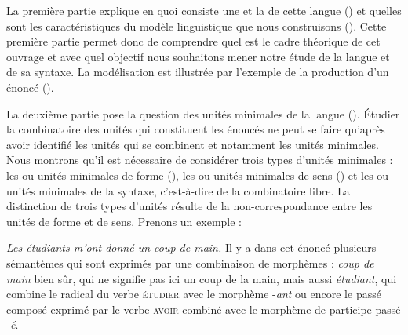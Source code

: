 La première partie explique en quoi consiste une  et la  de cette langue () et quelles sont les caractéristiques du modèle linguistique que nous construisons (). Cette première partie permet donc de comprendre quel est le cadre théorique de cet ouvrage et avec quel objectif nous souhaitons mener notre étude de la langue et de sa syntaxe. La modélisation est illustrée par l’exemple de la production d’un énoncé ().

La deuxième partie pose la question des unités minimales de la langue (). Étudier la combinatoire des unités qui constituent les énoncés ne peut se faire qu’après avoir identifié les unités qui se combinent et notamment les unités minimales. Nous montrons qu’il est nécessaire de considérer trois types d’unités minimales : les  ou unités minimales de forme (), les  ou unités minimales de sens () et les  ou unités minimales de la syntaxe, c’est-à-dire de la combinatoire libre. La distinction de trois types d’unités résulte de la non-correspondance entre les unités de forme et de sens. Prenons un exemple :

\ea
    \textit{Les étudiants m’ont donné un coup de main.}
\z
Il y a dans cet énoncé plusieurs sémantèmes qui sont exprimés par une combinaison de morphèmes : \textit{coup de main} bien sûr, qui ne signifie pas ici un coup de la main, mais aussi \textit{étudiant}, qui combine le radical du verbe \textsc{étudier} avec le morphème -\textit{ant} ou encore le passé composé exprimé par le verbe \textsc{avoir} combiné avec le morphème de participe passé \textit{{}-é}.

